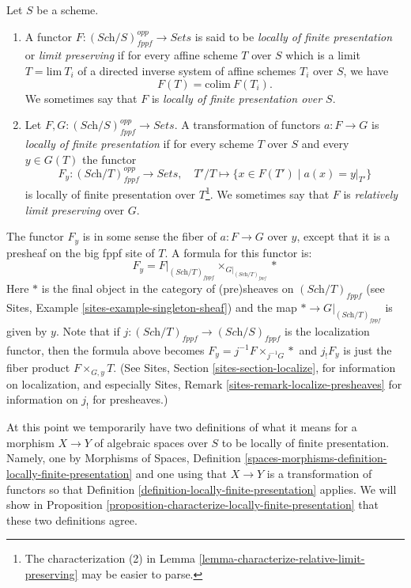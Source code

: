 \begin{definition}
\label{definition-locally-finite-presentation}
Let $S$ be a scheme.
\begin{enumerate}
\item A functor $F : (\textit{Sch}/S)_{fppf}^{opp} \to \textit{Sets}$
is said to be {\it locally of finite presentation} or {\it limit preserving} if
for every affine scheme $T$ over $S$ which is a limit $T = \text{lim}\ T_i$
of a directed inverse system of affine schemes $T_i$ over $S$, we have
$$
F(T) = \text{colim}\ F(T_i).
$$
We sometimes say that $F$ is {\it locally of finite presentation over $S$}.
\item Let $F, G : (\textit{Sch}/S)_{fppf}^{opp} \to \textit{Sets}$.
A transformation of functors $a : F \to G$
is {\it locally of finite presentation} if for every scheme $T$ over $S$
and every $y \in G(T)$ the functor
$$
F_y : (\textit{Sch}/T)_{fppf}^{opp} \longrightarrow \textit{Sets}, \quad
T'/T \longmapsto \{x \in F(T') \mid a(x) = y|_{T'}\}
$$
is locally of finite presentation over $T$\footnote{The characterization (2) in
Lemma \ref{lemma-characterize-relative-limit-preserving}
may be easier to parse.}. We sometimes say that
$F$ is {\it relatively limit preserving} over $G$.
\end{enumerate}
\end{definition}

\noindent
The functor $F_y$ is in some sense the fiber of
$a : F \to G$ over $y$, except that it is a presheaf on the big fppf
site of $T$. A formula for this functor is:
\begin{equation}
\label{equation-fibre-map-functors}
F_y =
F|_{(\textit{Sch}/T)_{fppf}}
{\times}_{G|_{(\textit{Sch}/T)_{fppf}}}
*
\end{equation}
Here $*$ is the final object in the category of (pre)sheaves
on $(\textit{Sch}/T)_{fppf}$ (see
Sites, Example \ref{sites-example-singleton-sheaf})
and the map $* \to G|_{(\textit{Sch}/T)_{fppf}}$ is given by $y$.
Note that if $j : (\textit{Sch}/T)_{fppf} \to (\textit{Sch}/S)_{fppf}$
is the localization functor, then the formula above becomes
$F_y = j^{-1}F \times_{j^{-1}G} *$ and $j_!F_y$ is just the fiber product
$F \times_{G, y} T$. (See
Sites, Section \ref{sites-section-localize},
for information on localization, and especially
Sites, Remark \ref{sites-remark-localize-presheaves}
for information on $j_!$ for presheaves.)

\medskip\noindent
At this point we temporarily have two definitions of what it means
for a morphism $X \to Y$ of algebraic spaces over $S$ to be locally of finite
presentation. Namely, one by
Morphisms of Spaces,
Definition \ref{spaces-morphisms-definition-locally-finite-presentation}
and one using that $X \to Y$ is a transformation of functors so that
Definition \ref{definition-locally-finite-presentation}
applies. We will show in
Proposition \ref{proposition-characterize-locally-finite-presentation}
that these two definitions agree.

